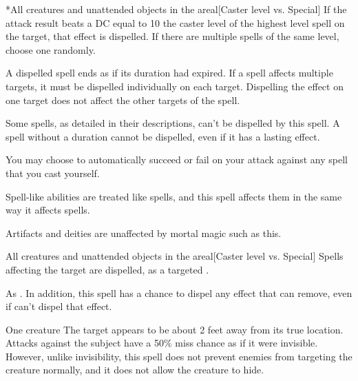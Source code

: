 \spellline
{}
\begin{spelltargets}*{All creatures and unattended objects in the area}l[Caster level vs. Special]
    \spelleffect If the attack result beats a DC equal to 10 \add the caster level of the highest level spell on the target, that effect is dispelled. If there are multiple spells of the same level, choose one randomly.
\end{spelltargets}

\spellnotes A dispelled spell ends as if its duration had expired. If a spell affects multiple targets, it must be dispelled individually on each target. Dispelling the effect on one target does not affect the other targets of the spell.

Some spells, as detailed in their descriptions, can't be dispelled by this spell. A spell without a duration cannot be dispelled, even if it has a lasting effect.

You may choose to automatically succeed or fail on your attack against any spell that you cast yourself.

Spell-like abilities are treated like spells, and this spell affects them in the same way it affects spells.

Artifacts and deities are unaffected by mortal magic such as this.

\begin{spelltargets}{All creatures and unattended objects in the area}l[Caster level vs. Special]
    \spelleffect Spells affecting the target are dispelled, as a targeted .
\end{spelltargets}
\spellnotes As . In addition, this spell has a chance to dispel any effect that  can remove, even if  can't dispel that effect.

\spellrng{\rngclose}
\spelldur{\durshort \dismissable}
\begin{spelltarget}{One creature}
    \spelleffect The target appears to be about 2 feet away from its true location. Attacks against the subject have a 50\% miss chance as if it were invisible. However, unlike invisibility, this spell does not prevent enemies from targeting the creature normally, and it does not allow the creature to hide.
\end{spelltarget}

